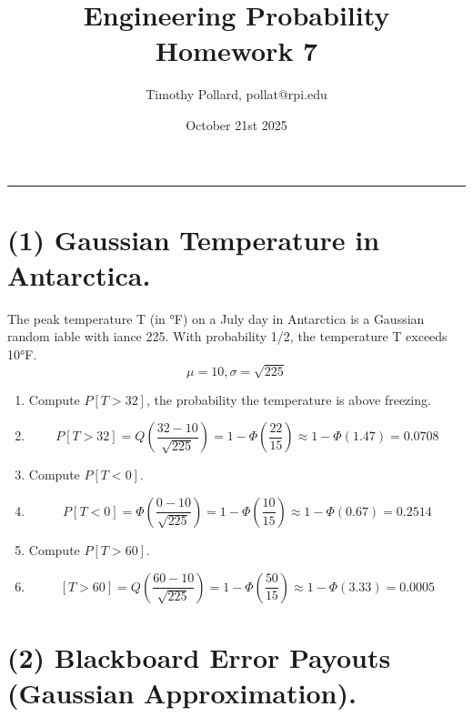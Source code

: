 \documentclass[12pt]{article}
\title{Engineering Probability \\ Homework 7}
\author{Timothy Pollard, pollat@rpi.edu}
\date{October 21st 2025}
\newenvironment{bluetext}{\color{blue}}{}
\begin{document}
\maketitle
\hrule


\section*{(1) Gaussian Temperature in Antarctica.}

The peak temperature T (in °F) on a July day in Antarctica is a Gaussian random
iable with iance 225. With probability 1/2, the temperature T exceeds 10°F.
\begin{bluetext}
    \[\mu = 10, \sigma = \sqrt{225}\]
\end{bluetext}\begin{enumerate}
    \item[(a)] Compute $P[T > 32]$, the probability the temperature is above freezing.
    \item[] \begin{bluetext}
        \[P[T>32]=Q\left(\frac{32-10}{\sqrt{225}}\right)=1-\Phi\left(\frac{22}{15}\right)\approx1-\Phi\left(1.47\right)=0.0708\]
    \end{bluetext}
    \item[(b)] Compute $P[T < 0]$.
    \item[] \begin{bluetext}
        \[P[T<0]=\Phi\left(\frac{0-10}{\sqrt{225}}\right)=1-\Phi\left(\frac{10}{15}\right)\approx1-\Phi\left(0.67\right)=0.2514\]
    \end{bluetext}
    \item[(c)] Compute $P[T > 60]$.
    \item[] \begin{bluetext}
        \[[T > 60]=Q\left(\frac{60-10}{\sqrt{225}}\right)=1-\Phi\left(\frac{50}{15}\right)\approx1-\Phi(3.33)=0.0005 \]
    \end{bluetext}
\end{enumerate}

\vspace{1cm}

\section*{(2) Blackboard Error Payouts (Gaussian Approximation).}
\end{document}
